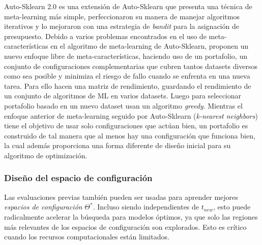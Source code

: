 Auto-Sklearn 2.0 \cite{Feurer2020AutoSklearn2T} es una extensión de Auto-Sklearn que presenta una técnica de meta-learning más simple, perfeccionaron su manera de manejar algoritmos iterativos y lo mejoraron con una estrategia de \textit{bandit} para la asignación de presupuesto. Debido a varios problemas encontrados en el uso de meta-características en el algoritmo de meta-learning de Auto-Sklearn, proponen un nuevo enfoque libre de meta-características, haciendo uso de un portafolio, un conjunto de configuraciones complementarias que cubren tantos datasets diversos como sea posible y minimiza el riesgo de fallo cuando se enfrenta en una nueva tarea. Para ello hacen una matriz de rendimiento, guardando el rendimiento de un conjunto de algoritmos de ML en varios datasets. Luego para seleccionar portafolio basado en un nuevo dataset usan un algoritmo \textit{greedy}. Mientras el enfoque anterior de meta-learning seguido por Auto-Sklearn (\textit{k-nearest neighbors}) tiene el objetivo de usar solo configuraciones que actúan bien, un portafolio es construido de tal manera que al menos hay una configuración que funciona bien, la cual además proporciona una forma diferente de diseño inicial para su algoritmo de optimización.

\subsubsection{Diseño del espacio de configuración}



Las evaluaciones previas también pueden ser usadas para aprender mejores \textit{espacios de configuración} $\Theta^*$. Incluso siendo independientes de $t_{new}$, esto puede radicalmente acelerar la búsqueda para modelos óptimos, ya que solo las regiones más relevantes de los espacios de configuración son explorados. Esto es crítico cuando los recursos computacionales están limitados. 

